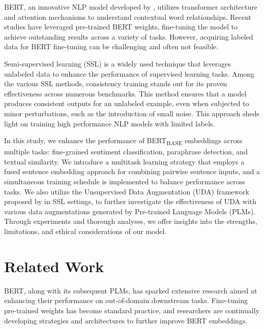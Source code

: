 \documentclass{article}
\begin{document}
BERT, an innovative NLP model developed by \cite{devlin2019bert}, utilizes transformer 
architecture and attention mechanisms to understand contextual word relationships. 
Recent studies have leveraged pre-trained BERT weights, fine-tuning the model to achieve 
outstanding results across a variety of tasks. However, acquiring labeled data 
for BERT fine-tuning can be challenging and often not feasible.

Semi-supervised learning (SSL) is a widely used technique that leverages unlabeled data 
to enhance the performance of supervised learning tasks. Among the various SSL methods, 
consistency training stands out for its proven effectiveness across numerous benchmarks. 
This method ensures that a model produces consistent outputs for an unlabeled example, 
even when subjected to minor perturbations, such as the introduction of small noise.
This approach sheds light on training high performance NLP models with limited labels.

In this study, we enhance the performance of BERT\textsubscript{BASE} embeddings 
across multiple tasks: fine-grained sentiment classification, paraphrase detection, 
and textual similarity. We introduce a multitask learning strategy that employs a 
fused sentence embedding approach for combining pairwise sentence inputs, and a
simultaneous training schedule is implemented to balance performance across tasks.
We also utilize the Unsupervised Data Augmentation (UDA) framework proposed by
\cite{xie2020unsupervised} in SSL 
settings, to further investigate the effectiveness of UDA with various data 
augmentations generated by Pre-trained Language Models (PLMs). 
Through experiments and thorough analyses, we offer
insights into the strengths, limitations, and ethical considerations of our model.

\section{Related Work}

BERT, along with its subsequent PLMs, has sparked extensive 
research aimed at enhancing their performance on out-of-domain downstream tasks. Fine-tuning 
pre-trained weights has become standard practice, and researchers are continually developing 
strategies and architectures to further improve BERT embeddings.
\end{document}
